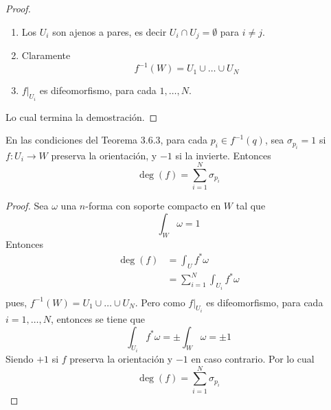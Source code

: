 \documentclass[12pt]{report}
\theoremstyle{largebreak}
\newcommand\cf[3]{\ensuremath{#1:#2\rightarrow#3}}
\begin{document}
\begin{proof}
    \begin{enumerate}
        \item Los $U_i$ son ajenos a pares, es decir $U_i\cap U_j=\emptyset$ para $i\neq j$.
        \item Claramente
        \begin{equation*}
            f^{-1}(W)=U_1\cup\dots\cup U_N
        \end{equation*}
        \item $f|_{U_i}$ es difeomorfismo, para cada $1,\dots,N$.
    \end{enumerate}
    
    Lo cual termina la demostración.
\end{proof}

\begin{theor}
    En las condiciones del Teorema 3.6.3, para cada $p_i\in f^{-1}(q)$, sea $\sigma_{p_i}=1$ si $\cf{f}{U_i}{W}$ preserva la orientación, y $-1$ si la invierte. Entonces
    \begin{equation*}
        \deg(f)=\sum_{i=1}^{N}\sigma_{p_i}
    \end{equation*}
\end{theor}

\begin{proof}
    Sea $\omega$ una $n$-forma con soporte compacto en $W$ tal que
    \begin{equation*}
        \int_{W}\omega = 1
    \end{equation*}
    Entonces
    \begin{equation*}
        \begin{split}
            \deg(f)&=\int_{U}f^*\omega\\
            &=\sum_{i=1}^{N}\int_{U_i}f^*\omega\\
        \end{split}
    \end{equation*}
    pues, $f^{-1}(W)=U_1\cup\dots\cup U_N$. Pero como $f|_{U_i}$ es difeomorfismo, para cada $i=1,\dots,N$, entonces se tiene que
    \begin{equation*}
        \int_{U_i}f^*\omega=\pm \int_{W}\omega=\pm 1
    \end{equation*}
    Siendo $+1$ si $f$ preserva la orientación y $-1$ en caso contrario. Por lo cual
    \begin{equation*}
        \deg(f)=\sum_{i=1}^{N}\sigma_{p_i}
    \end{equation*}
\end{proof}
\end{document}
